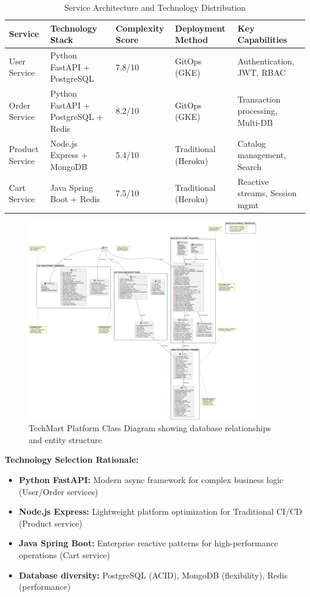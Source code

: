 \begin{table}[H]
\centering
\caption{Service Architecture and Technology Distribution}
\label{tab:service-architecture-comparison}
\begin{tabular}{|p{2.5cm}|p{3cm}|p{1.5cm}|p{2.5cm}|p{4cm}|}
\hline
\textbf{Service} & \textbf{Technology Stack} & \textbf{Complexity Score} & \textbf{Deployment Method} & \textbf{Key Capabilities} \\
\hline
User Service & Python FastAPI + PostgreSQL & 7.8/10 & GitOps (GKE) & Authentication, JWT, RBAC \\
\hline
Order Service & Python FastAPI + PostgreSQL + Redis & 8.2/10 & GitOps (GKE) & Transaction processing, Multi-DB \\
\hline
Product Service & Node.js Express + MongoDB & 5.4/10 & Traditional (Heroku) & Catalog management, Search \\
\hline
Cart Service & Java Spring Boot + Redis & 7.5/10 & Traditional (Heroku) & Reactive streams, Session mgmt \\
\hline
\end{tabular}
\end{table}

\begin{figure}[H]
\centering
\includegraphics[width=0.9\textwidth]{figures/chapter4/class-diagram.png}
\caption{TechMart Platform Class Diagram showing database relationships and entity structure}
\label{fig:class-diagram}
\end{figure}

\textbf{Technology Selection Rationale:}
\begin{itemize}
\item \textbf{Python FastAPI:} Modern async framework for complex business logic (User/Order services)
\item \textbf{Node.js Express:} Lightweight platform optimization for Traditional CI/CD (Product service)
\item \textbf{Java Spring Boot:} Enterprise reactive patterns for high-performance operations (Cart service)
\item \textbf{Database diversity:} PostgreSQL (ACID), MongoDB (flexibility), Redis (performance)
\end{itemize}


